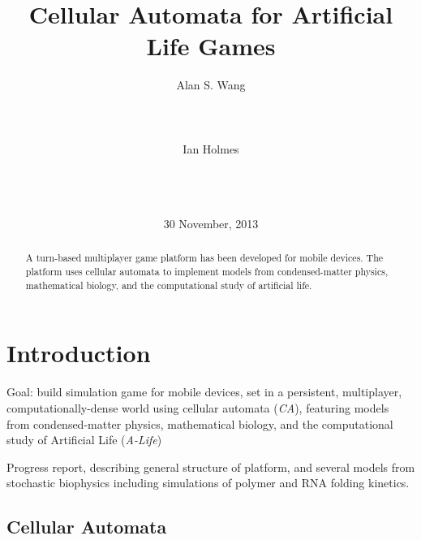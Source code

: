 \documentclass{acm_proc_article-sp}
\begin{document}
\title{Cellular Automata for Artificial Life Games}
\author{
\alignauthor
Alan S. Wang\\
       \\
       \\
       \\
\alignauthor
Ian Holmes\\
       \\
       \\
       \\
}
\date{30 November, 2013}

\maketitle
\begin{abstract}
A turn-based multiplayer game platform has been developed for mobile devices.
The platform uses cellular automata to implement models
from condensed-matter physics, mathematical biology,
and the computational study of artificial life.
\end{abstract}



\section{Introduction}

Goal: 
build simulation game for mobile devices,
set in a persistent, multiplayer, computationally-dense world
using cellular automata ({\em CA}),
featuring models from
condensed-matter physics,
mathematical biology,
 and
the computational study of Artificial Life ({\em A-Life})

Progress report, describing general structure of platform,
and several models from stochastic biophysics
including simulations of polymer and RNA folding kinetics.

\subsection{Cellular Automata}
\end{document}
